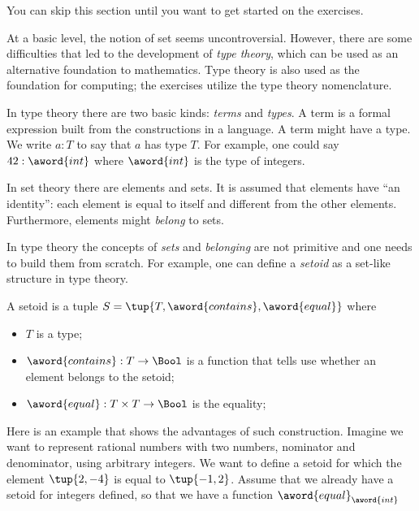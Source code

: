 
\begin{remark}
    You can skip this section until you want to get started on the exercises.
\end{remark}

At a basic level, the notion of set seems uncontroversial.
However, there are some difficulties that led to the development of \emph{type theory},
which can be used as an alternative foundation to mathematics.
Type theory is also used as the foundation for computing; the exercises utilize the type theory nomenclature.


In type theory there are two basic kinds: \emph{terms} and \emph{types}.
A term is a formal expression built from the constructions in a language.
A term might have a type.
We write $a : T$ to say that $a$ has type $T$.
For example, one could say $42 : \aword{int}$ where $\aword{int}$ is the type of integers.

In set theory there are elements and sets.
It is assumed that elements have ``an identity'': each element is equal to itself and different from the other elements.
Furthermore, elements might \emph{belong} to sets.

In type theory the concepts of \emph{sets} and \emph{belonging} are not primitive and one needs to build them from scratch.
For example, one can define a \emph{setoid} as a set-like structure in type theory.

\begin{ctdefinition}[Setoid]
    A setoid is a tuple $S = \tup{T, \aword{contains}, \aword{equal}}$ where
    \begin{itemize}
        \item $T$ is a type;
        \item $\aword{contains}:T\to\Bool$ is a function that tells use whether an element belongs to the setoid;
        \item $\aword{equal}:T\times T\to\Bool$ is the equality;
    \end{itemize}
\end{ctdefinition}


Here is an example that shows the advantages of such construction.
Imagine we want to represent rational numbers with two numbers, nominator and denominator, using arbitrary integers.
We want to define a setoid for which the element $\tup{2, -4}$ is equal to $\tup{-1, 2}$.
Assume that we already have a setoid for integers defined, so that we have a function $\aword{equal}_{\aword{int}}$


